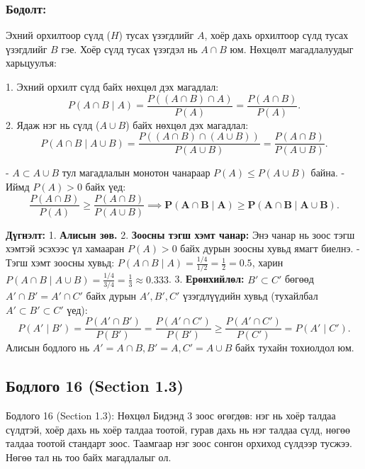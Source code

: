 \documentclass[11pt,a4paper]{article}
\begin{document}
\subsubsection*{Бодолт:}

Эхний орхилтоор сүлд ($H$) тусах үзэгдлийг $A$, хоёр дахь орхилтоор сүлд тусах үзэгдлийг $B$ гэе.
Хоёр сүлд тусах үзэгдэл нь $A \cap B$ юм. Нөхцөлт магадлалуудыг харьцуулъя:

1. Эхний орхилт сүлд байх нөхцөл дэх магадлал:
   \[
     P(A \cap B \mid A) = \frac{P((A \cap B) \cap A)}{P(A)} = \frac{P(A \cap B)}{P(A)}.
   \]
2. Ядаж нэг нь сүлд ($A \cup B$) байх нөхцөл дэх магадлал:
   \[
     P(A \cap B \mid A \cup B) = \frac{P((A \cap B) \cap (A \cup B))}{P(A \cup B)} = \frac{P(A \cap B)}{P(A \cup B)}.
   \]

- $A \subset A \cup B$ тул магадлалын монотон чанараар $P(A) \le P(A \cup B)$ байна.
- Иймд $P(A) > 0$ байх үед:
  \[
    \frac{P(A \cap B)}{P(A)} \ge \frac{P(A \cap B)}{P(A \cup B)} \implies \mathbf{P(A \cap B \mid A) \ge P(A \cap B \mid A \cup B)}.
  \]

				\textbf{Дүгнэлт:}
1. 				\textbf{Алисын зөв.}
2. 				\textbf{Зоосны тэгш хэмт чанар:} Энэ чанар нь зоос тэгш хэмтэй эсэхээс үл хамааран $P(A) > 0$ байх дурын зоосны хувьд ямагт биелнэ.
   - Тэгш хэмт зоосны хувьд: $P(A \cap B \mid A) = \frac{1/4}{1/2} = \frac{1}{2} = 0.5$, харин $P(A \cap B \mid A \cup B) = \frac{1/4}{3/4} = \frac{1}{3} \approx 0.333$.
3. 				\textbf{Ерөнхийлөл:}
   $B' \subset C'$ бөгөөд $A' \cap B' = A' \cap C'$ байх дурын $A', B', C'$ үзэгдлүүдийн хувьд (тухайлбал $A' \subset B' \subset C'$ үед):
   \[
     P(A' \mid B') = \frac{P(A' \cap B')}{P(B')} = \frac{P(A' \cap C')}{P(B')} \ge \frac{P(A' \cap C')}{P(C')} = P(A' \mid C').
   \]
   Алисын бодлого нь $A' = A \cap B, B' = A, C' = A \cup B$ байх тухайн тохиолдол юм.

\vspace{0.8em}

\subsection*{Бодлого 16 (Section 1.3)}

\begin{problembox}{Бодлого 16 (Section 1.3): Нөхцөл}
Бидэнд 3 зоос өгөгдөв: нэг нь хоёр талдаа сүлдтэй, хоёр дахь нь хоёр талдаа тоотой, гурав дахь нь нэг талдаа сүлд, нөгөө талдаа тоотой стандарт зоос. Таамгаар нэг зоос сонгон орхиход сүлдээр тусжээ. Нөгөө тал нь тоо байх магадлалыг ол.
\end{problembox}
\end{document}
